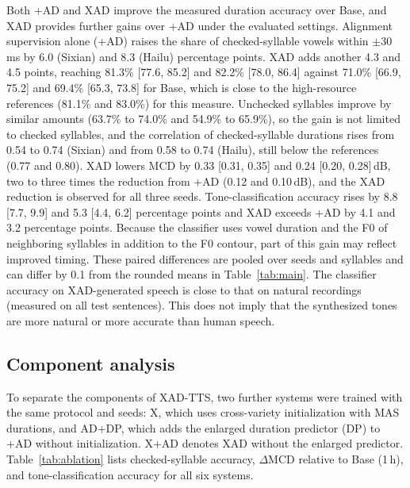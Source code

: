 \documentclass[conference,a4paper]{IEEEtran}
\begin{document}
Both +AD and XAD improve the measured duration accuracy over Base, and XAD provides further gains over +AD under the evaluated settings. Alignment supervision alone (+AD) raises the share of checked-syllable vowels within $\pm$30\,ms by 6.0 (Sixian) and 8.3 (Hailu) percentage points. XAD adds another 4.3 and 4.5 points, reaching 81.3\% [77.6, 85.2] and 82.2\% [78.0, 86.4] against 71.0\% [66.9, 75.2] and 69.4\% [65.3, 73.8] for Base, which is close to the high-resource references (81.1\% and 83.0\%) for this measure. Unchecked syllables improve by similar amounts (63.7\% to 74.0\% and 54.9\% to 65.9\%), so the gain is not limited to checked syllables, and the correlation of checked-syllable durations rises from 0.54 to 0.74 (Sixian) and from 0.58 to 0.74 (Hailu), still below the references (0.77 and 0.80). XAD lowers MCD by 0.33 [0.31, 0.35] and 0.24 [0.20, 0.28]\,dB, two to three times the reduction from +AD (0.12 and 0.10\,dB), and the XAD reduction is observed for all three seeds. Tone-classification accuracy rises by 8.8 [7.7, 9.9] and 5.3 [4.4, 6.2] percentage points and XAD exceeds +AD by 4.1 and 3.2 percentage points. Because the classifier uses vowel duration and the F0 of neighboring syllables in addition to the F0 contour, part of this gain may reflect improved timing. These paired differences are pooled over seeds and syllables and can differ by 0.1 from the rounded means in Table~\ref{tab:main}. The classifier accuracy on XAD-generated speech is close to that on natural recordings (measured on all test sentences). This does not imply that the synthesized tones are more natural or more accurate than human speech.

\subsection{Component analysis}
To separate the components of XAD-TTS, two further systems were trained with the same protocol and seeds: X, which uses cross-variety initialization with MAS durations, and AD+DP, which adds the enlarged duration predictor (DP) to +AD without initialization. X+AD denotes XAD without the enlarged predictor. Table~\ref{tab:ablation} lists checked-syllable accuracy, $\Delta$MCD relative to Base (1\,h), and tone-classification accuracy for all six systems.
\end{document}
